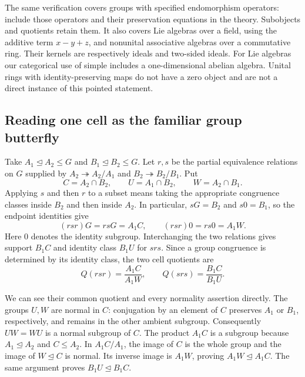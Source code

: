 \documentclass[11pt]{article}
\theoremstyle{definition}
\theoremstyle{remark}\newtheorem{remark}[theorem]{Remark}
\newcommand{\nml}{\trianglelefteq}
\begin{document}
The same verification covers groups with specified endomorphism operators:
include those operators and their preservation equations in the theory.
Subobjects and quotients retain them. It also covers Lie algebras over a field,
using the additive term $x-y+z$, and nonunital associative algebras over a
commutative ring. Their kernels are respectively ideals and two-sided ideals.
For Lie algebras our categorical use of simple includes a one-dimensional
abelian algebra. Unital rings with identity-preserving maps do not have a zero
object and are not a direct instance of this pointed statement.

\subsection{Reading one cell as the familiar group butterfly}
\label{e:butterfly-dictionary}

Take $A_1\nml A_2\leq G$ and $B_1\nml B_2\leq G$.
Let $r,s$ be the partial equivalence relations on $G$ supplied by
$A_2\twoheadrightarrow A_2/A_1$ and $B_2\twoheadrightarrow B_2/B_1$.
Put
\[
 C=A_2\cap B_2,\qquad U=A_1\cap B_2,\qquad W=A_2\cap B_1.
\]
Applying $s$ and then $r$ to a subset means taking the appropriate
congruence classes inside $B_2$ and then inside $A_2$. In particular,
$sG=B_2$ and $s0=B_1$, so the endpoint identities give
\[
 (rsr)G=rsG=A_1C,\qquad (rsr)0=rs0=A_1W.
\]
Here $0$ denotes the identity subgroup. Interchanging the two relations gives
support $B_1C$ and identity class $B_1U$ for $srs$. Since a group
congruence is determined by its identity class, the two cell quotients are
\[
 Q(rsr)=\frac{A_1C}{A_1W},\qquad
 Q(srs)=\frac{B_1C}{B_1U}.
\]

We can see their common quotient and every normality assertion directly.
The groups $U,W$ are normal in $C$: conjugation by an element of $C$
preserves $A_1$ or $B_1$, respectively, and remains in the other ambient
subgroup. Consequently $UW=WU$ is a normal subgroup of $C$.
The product $A_1C$ is a subgroup because $A_1\nml A_2$ and $C\leq A_2$.
In $A_1C/A_1$, the image of $C$ is the whole group and the image of
$W\nml C$ is normal. Its inverse image is $A_1W$, proving
$A_1W\nml A_1C$. The same argument proves $B_1U\nml B_1C$.
\end{document}
